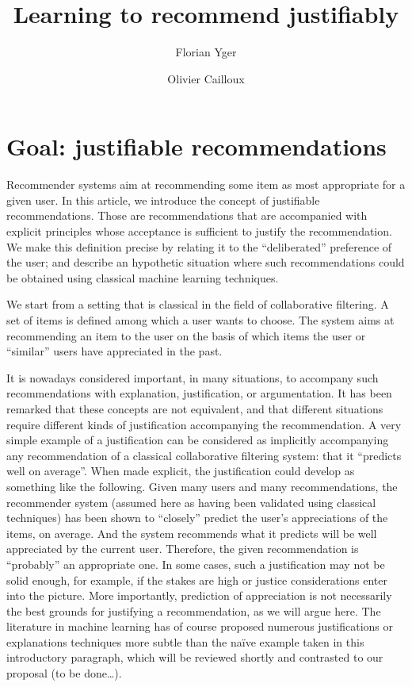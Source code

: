 \documentclass[version=last, pagesize, twoside=off, bibliography=totoc, DIV=calc, fontsize=14pt, a4paper, french, english]{scrartcl}
\begin{document}
\title{%
	Learning to recommend justifiably%
}
\author{Florian Yger}
\author{Olivier Cailloux}
\makeatletter
\makeatother
\maketitle

\section{Goal: justifiable recommendations}
Recommender systems aim at recommending some item as most appropriate for a given user. In this article, we introduce the concept of justifiable recommendations. Those are recommendations that are accompanied with explicit principles whose acceptance is sufficient to justify the recommendation. We make this definition precise by relating it to the “deliberated” preference of the user; and describe an hypothetic situation where such recommendations could be obtained using classical machine learning techniques.

We start from a setting that is classical in the field of collaborative filtering. A set of items is defined among which a user wants to choose. The system aims at recommending an item to the user on the basis of which items the user or “similar” users have appreciated in the past.

It is nowadays considered important, in many situations, to accompany such recommendations with explanation, justification, or argumentation. It has been remarked that these concepts are not equivalent, and that different situations require different kinds of justification accompanying the recommendation. A very simple example of a justification can be considered as implicitly accompanying any recommendation of a classical collaborative filtering system: that it “predicts well on average”. When made explicit, the justification could develop as something like the following. Given many users and many recommendations, the recommender system (assumed here as having been validated using classical techniques) has been shown to “closely” predict the user’s appreciations of the items, on average. And the system recommends what it predicts will be well appreciated by the current user. Therefore, the given recommendation is “probably” an appropriate one. In some cases, such a justification may not be solid enough, for example, if the stakes are high or justice considerations enter into the picture. More importantly, prediction of appreciation is not necessarily the best grounds for justifying a recommendation, as we will argue here. The literature in machine learning has of course proposed numerous justifications or explanations techniques more subtle than the naïve example taken in this introductory paragraph, which will be reviewed shortly and contrasted to our proposal (to be done…).
\end{document}
